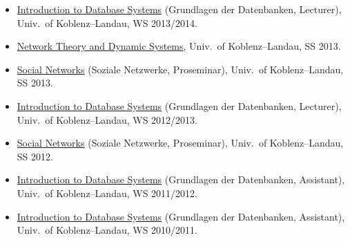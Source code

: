 \documentclass[line,mm]{res}
\begin{document}
\begin{resume}
\begin{itemize}
{    Theory and Dynamic Systems}, Univ.\ of Koblenz--Landau, SS 2014.
\item
  \href{http://west.uni-koblenz.de/teaching/ws1314/GdDB/GdDB}{Introduction
    to Database Systems} (Grundlagen der Datenbanken, 
  Lecturer), Univ.\ of Koblenz--Landau, WS 2013/2014.
\item 
  \href{https://west.uni-koblenz.de/teaching/ss13/network-theory-and-dynamic-systems}{Network
    Theory and Dynamic Systems}, Univ.\ of Koblenz--Landau, SS 2013.
\item
  \href{https://west.uni-koblenz.de/teaching/ss13/proseminar-soziale-netzwerke}{Social
  Networks} (Soziale Netzwerke, Proseminar), Univ.\ of Koblenz--Landau, SS 2013.
\item
  \href{https://www.uni-koblenz-landau.de/campus-koblenz/fb4/west/teaching/ws1213/datenbanken}{Introduction
    to Database Systems} (Grundlagen der Datenbanken, 
  Lecturer), Univ.\ of Koblenz--Landau, WS 2012/2013.
\item
  \href{https://www.uni-koblenz-landau.de/koblenz/fb4/AGStaab/Teaching/ss12/proseminar-soziale-netzwerke}{Social
  Networks} (Soziale Netzwerke, Proseminar), Univ.\ of Koblenz--Landau, SS 2012.
\item
  \href{http://www.uni-koblenz-landau.de/koblenz/fb4/AGStaab/Teaching/ws1112/Datenbanken}{Introduction
  to Database Systems} (Grundlagen der Datenbanken, Assistant), Univ.\ of
  Koblenz--Landau, WS 2011/2012. 
\item 
  \href{http://www.uni-koblenz-landau.de/koblenz/fb4/institute/IFI/AGStaab/Teaching/ws1011/Datenbanken/}{Introduction
  to Database Systems} (Grundlagen der Datenbanken, Assistant), Univ.\ of
  Koblenz--Landau, WS 2010/2011. 
\end{itemize}


\end{resume}
\end{document}
